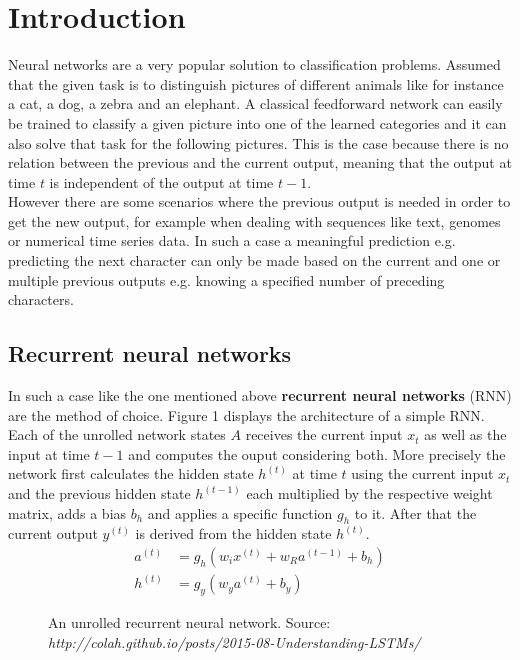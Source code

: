 \documentclass[11pt,a4paper,bibliography=totocnumbered,listof=totocnumbered]{scrartcl}
\begin{document}
\section{Introduction}

Neural networks are a very popular solution to classification problems.
Assumed that the given task is to distinguish pictures of different animals like for instance a cat, a dog, a zebra and an elephant. A classical feedforward network can easily be trained to classify a given picture into one of the learned categories and it can also solve that task for the following pictures. This is the case because there is no relation between the previous and the current output, meaning that the output at time $t$ is independent of the output at time $t-1$. \\
However there are some scenarios where the previous output is needed in order to get the new output, for example when dealing with sequences like text, genomes or numerical time series data. In such a case a meaningful prediction e.g. predicting the next character can only be made based on the current and one or multiple previous outputs e.g. knowing a specified number of preceding characters.


\subsection{Recurrent neural networks}
In such a case like the one mentioned above \textbf{recurrent neural networks} (RNN) are the method of choice. Figure 1 displays the architecture of a simple RNN. Each of the unrolled network states $A$ receives the current input $x_t$ as well as the input at time $t-1$ and computes the ouput considering both. More precisely the network first calculates the hidden state $h^{(t)}$ at time $t$ using the current input $x_t$ and the previous hidden state $h^{(t-1)}$ each multiplied by the respective weight matrix, adds a bias $b_h$ and applies a specific function $g_h$ to it. After that the current output $y^{(t)}$ is derived from the hidden state $h^{(t)}$. 
\begin{align*}
	a^{(t)} &= g_h(w_i x^{(t)} + w_R a^{(t-1)} + b_h) \\
	h^{(t)} &= g_y(w_y a^{(t)} + b_y)
\end{align*} 

	\begin{figure}[h!] 
	\begin{minipage}{\textwidth}
     \centering
		\label{fig:rnn0}
		\caption{An unrolled recurrent neural network. Source: \textit{http://colah.github.io/posts/2015-08-Understanding-LSTMs/}}
	\end{minipage}
	\end{figure}
\end{document}
